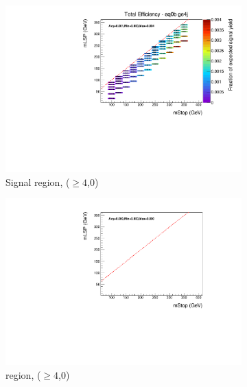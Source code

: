 \begin{figure}[p]
  \begin{subfigure}[b]{0.47\textwidth}
    \includegraphics[width=\textwidth]{Figs/sms/t2cc/v37/effs/T2cc_had_eff_maps_eq0b_ge4j_SITV.pdf}
    \caption{Signal region, ($\geq 4$,0)}
    \label{fig:t2cc_sig_eff_ge4j_0b}
  \end{subfigure}
  \begin{subfigure}[b]{0.47\textwidth}
    \includegraphics[width=\textwidth]{Figs/sms/t2cc/v37/effs/T2cc_muon_eff_maps_eq0b_ge4j_SITV.pdf}
    \caption{\mj region, ($\geq 4$,0)}
    \label{fig:t2cc_mu_eff_ge4j_0b}
  \end{subfigure} \\
  \begin{subfigure}[b]{0.47\textwidth}

\end{subfigure}
\end{figure}

